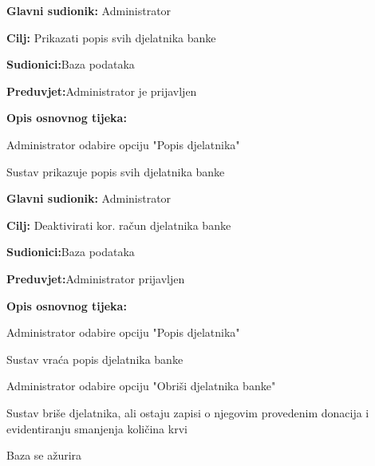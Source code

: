 \eject
\noindent {}

\begin{packed_item}
	
	\item \textbf{Glavni sudionik: }{Administrator}
	\item  \textbf{Cilj:} {Prikazati popis svih djelatnika banke}
	\item  \textbf{Sudionici:}{Baza podataka} 
	\item  \textbf{Preduvjet:}{Administrator je prijavljen}
	\item  \textbf{Opis osnovnog tijeka:}
	
	\item[] \begin{packed_enum}
		
		\item {Administrator odabire opciju "Popis djelatnika"}
		\item {Sustav prikazuje popis svih djelatnika banke}
		\end{packed_enum}
\end{packed_item}


\noindent {}

\begin{packed_item}
	\item \textbf{Glavni sudionik: }{Administrator}
	\item  \textbf{Cilj:} {Deaktivirati kor. račun djelatnika banke}
	\item  \textbf{Sudionici:}{Baza podataka}
	\item  \textbf{Preduvjet:}{Administrator prijavljen}
	\item  \textbf{Opis osnovnog tijeka:}
	
	\item[] \begin{packed_enum}
		
		\item {Administrator odabire opciju "Popis djelatnika"}
		\item {Sustav vraća popis djelatnika banke}
		\item {Administrator odabire opciju "Obriši djelatnika banke"}
		\item {Sustav briše djelatnika, ali ostaju zapisi o njegovim provedenim donacija i evidentiranju smanjenja količina krvi}
		\item {Baza se ažurira}
	\end{packed_enum}
	
\end{packed_item}


